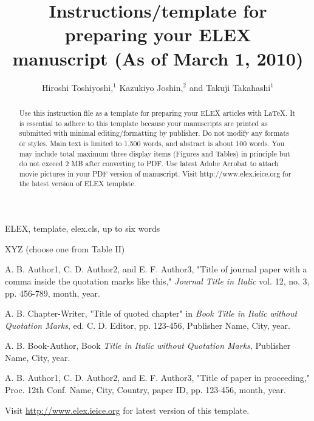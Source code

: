 \documentclass{elex}
\title{Instructions/template for\\
preparing your ELEX\\
manuscript (As of March 1, 2010)}
\author{Hiroshi Toshiyoshi,$^{1}$ Kazukiyo Joshin,$^{2}$ and Takuji Takahashi$^{1}$}
\begin{document}
\maketitle 

\begin{abstract} 

Use this instruction file as a template for preparing your ELEX articles with LaTeX.  It is essential to adhere to this template because your manuscripts are printed as submitted with minimal editing/formatting by publisher.  Do not modify any formats or styles.  Main text is limited to 1,500 words, and abstract is about 100 words. You may include total maximum three display items (Figures and Tables) in principle but do not exceed 2 MB after converting to PDF.  Use latest Adobe Acrobat to attach movie pictures in your PDF version of manuscript.  Visit
http://www.elex.ieice.org for the latest version of ELEX template.
\end{abstract}

\begin{keywords}
ELEX, template, elex.cls, up to six words
\end{keywords}

\begin{classification}
XYZ (choose one from Table II)
\end{classification}


\begin{thebibliography}{99}

 A. B. Author1, C. D. Author2, and E. F. Author3, "Title of journal paper with a comma inside the quotation marks like this," {\it Journal Title in Italic} vol. 12, no. 3, pp. 456-789, month, year.

 A. B. Chapter-Writer, "Title of quoted chapter" in {\it Book Title in Italic without Quotation Marks}, ed. C. D. Editor, pp. 123-456, Publisher Name, City, year.

 A. B. Book-Author, Book {\it Title in Italic without Quotation Marks}, Publisher Name, City, year.


 A. B. Author1, C. D. Author2, and E. F. Author3, "Title of paper in proceeding," Proc. 12th Conf. Name, City, Country, paper ID, pp. 123-456, month, year.


 Visit \underline{http://www.elex.ieice.org} for latest version of this template.


\end{thebibliography}
\end{document}
